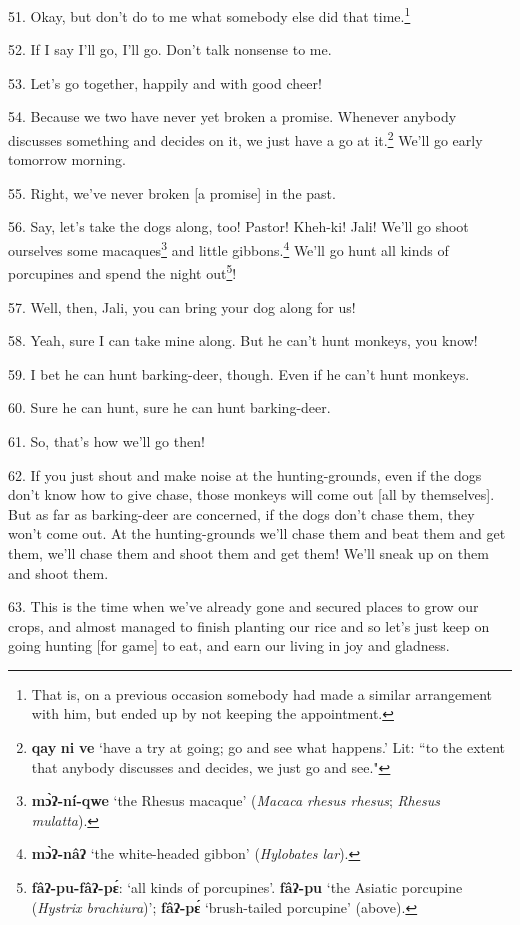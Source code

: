 51. Okay, but don't do to me what somebody else did that time.\footnote{That is, on a previous occasion somebody had made a similar arrangement with him, but ended up by not keeping the appointment.}

52. If I say I'll go, I'll go. Don't talk nonsense to me.

53. Let's go together, happily and with good cheer!

54. Because we two have never yet broken a promise. Whenever anybody discusses
something and decides on it, we just have a go at it.\footnote{\textbf{qay} \textbf{ni} \textbf{ve} `have a try at going; go and see what happens.' Lit: ``to the extent that anybody discusses and decides, we just go and see."} We'll go early tomorrow
morning.

55. Right, we've never broken [a promise] in the past.

56. Say, let's take the dogs along, too! Pastor! Kheh-ki! Jali! We'll go shoot
ourselves some macaques\footnote{\textbf{mɔ̀ʔ-ní-qwe} `the Rhesus macaque' (\textit{Macaca rhesus rhesus}; \textit{Rhesus mulatta}).} and little gibbons.\footnote{\textbf{mɔ̀ʔ-nâʔ} `the white-headed gibbon' (\textit{Hylobates lar}).} We'll go hunt all kinds of
porcupines and spend the night out\footnote{\textbf{fâʔ-pu-fâʔ-pɛ́}: `all kinds of porcupines'. \textbf{fâʔ-pu} `the Asiatic porcupine (\textit{Hystrix brachiura})'; \textbf{fâʔ-pɛ́} `brush-tailed porcupine' (above).}!

57. Well, then, Jali, you can bring your dog along for us!

58. Yeah, sure I can take mine along. But he can't hunt monkeys, you know!

59. I bet he can hunt barking-deer, though. Even if he can't hunt monkeys.

60. Sure he can hunt, sure he can hunt barking-deer.

61. So, that's how we'll go then!

62. If you just shout and make noise at the hunting-grounds, even if the dogs don't
know how to give chase, those monkeys will come out [all by themselves]. But as
far as barking-deer are concerned, if the dogs don't chase them, they won't come
out. At the hunting-grounds we'll chase them and beat them and get them, we'll
chase them and shoot them and get them! We'll sneak up on them and shoot them.

63. This is the time when we've already gone and secured places to grow our crops,
and almost managed to finish planting our rice and so let's just keep on going
hunting [for game] to eat, and earn our living in joy and gladness.


